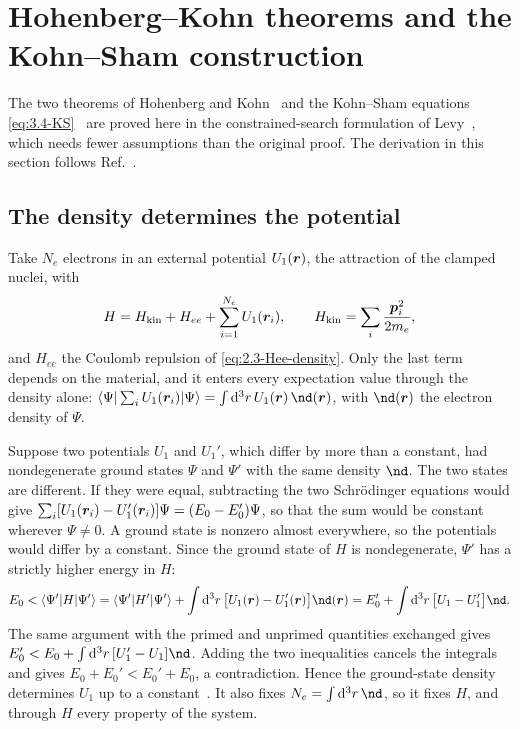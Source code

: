 \let\origsectionmark\sectionmark\renewcommand*{\sectionmark}[1]{\origsectionmark{Hohenberg--Kohn theorems and Kohn--Sham construction}}%
\section{Hohenberg--Kohn theorems and the Kohn--Sham construction}\label{app:D.5}
\let\sectionmark\origsectionmark

The two theorems of Hohenberg and Kohn~\cite{hohenberg1964inhomogeneous} and the Kohn--Sham equations \cref{eq:3.4-KS}~\cite{kohn1965self} are proved here in the constrained-search formulation of Levy~\cite{levy1979universal}, which needs fewer assumptions than the original proof. The derivation in this section follows Ref.~\cite[Chaps.~6 and 7]{martin2004electronic}.

\subsection{The density determines the potential}

Take $N_e$ electrons in an external potential $U_1(\bm{r})$, the attraction of the clamped nuclei, with
\begin{equation*}
  H = H_{\mathrm{kin}} + H_{ee} + \sum_{i=1}^{N_e}U_1(\bm{r}_i), \qquad H_{\mathrm{kin}} = \sum_i\frac{\bm{p}_i^2}{2m_e} ,
\end{equation*}
and $H_{ee}$ the Coulomb repulsion of \cref{eq:2.3-Hee-density}. Only the last term depends on the material, and it enters every expectation value through the density alone: $\langle\Psi|\sum_iU_1(\vect{r}_i)|\Psi\rangle = \int\dd^3r\,U_1(\vect{r})\,\nd(\vect{r})$, with $\nd(\vect{r})$ the electron density of $\Psi$.

Suppose two potentials $U_1$ and $U_1'$, which differ by more than a constant, had nondegenerate ground states $\Psi$ and $\Psi'$ with the same density $\nd$. The two states are different. If they were equal, subtracting the two Schr\"odinger equations would give $\sum_i[U_1(\bm{r}_i) - U_1'(\bm{r}_i)]\Psi = (E_0 - E_0')\Psi$, so that the sum would be constant wherever $\Psi \neq 0$. A ground state is nonzero almost everywhere, so the potentials would differ by a constant. Since the ground state of $H$ is nondegenerate, $\Psi'$ has a strictly higher energy in $H$:
\begin{equation*}
  E_0 < \langle\Psi'|H|\Psi'\rangle = \langle\Psi'|H'|\Psi'\rangle + \int\dd^3r\,\bigl[U_1(\vect{r}) - U_1'(\vect{r})\bigr]\nd(\vect{r}) = E_0' + \int\dd^3r\,\bigl[U_1 - U_1'\bigr]\nd .
\end{equation*}
The same argument with the primed and unprimed quantities exchanged gives $E_0' < E_0 + \int\dd^3r\,[U_1' - U_1]\nd$. Adding the two inequalities cancels the integrals and gives $E_0 + E_0' < E_0' + E_0$, a contradiction. Hence the ground-state density determines $U_1$ up to a constant~\cite{hohenberg1964inhomogeneous}. It also fixes $N_e = \int\dd^3r\,\nd$, so it fixes $H$, and through $H$ every property of the system.

